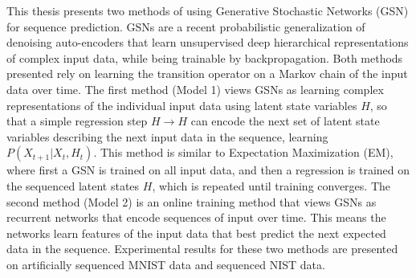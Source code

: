 This thesis presents two methods of using Generative Stochastic Networks (GSN) for sequence prediction. GSNs are a recent probabilistic generalization of denoising auto-encoders that learn unsupervised deep hierarchical representations of complex input data, while being trainable by backpropagation. Both methods presented rely on learning the transition operator on a Markov chain of the input data over time. The first method (Model 1) views GSNs as learning complex representations of the individual input data using latent state variables \(H\), so that a simple regression step \(H \rightarrow H\) can encode the next set of latent state variables describing the next input data in the sequence, learning \(P(X_{t+1}|X_t, H_t)\). This method is similar to Expectation Maximization (EM), where first a GSN is trained on all input data, and then a regression is trained on the sequenced latent states \(H\), which is repeated until training converges. The second method (Model 2) is an online training method that views GSNs as recurrent networks that encode sequences of input over time. This means the networks learn features of the input data that best predict the next expected data in the sequence. Experimental results for these two methods are presented on artificially sequenced MNIST data and sequenced NIST data.